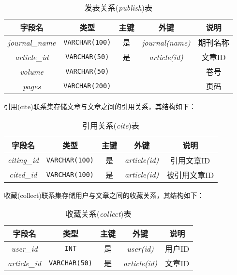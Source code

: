 \documentclass[UTF8,openany]{ctexbook}
\begin{document}
\begin{table}[H]
    \centering
    \begin{tabular}{|c|c|c|c|c|}
    \hline
    \textbf{字段名} & \textbf{类型} & \textbf{主键} & \textbf{外键} & \textbf{说明} \\
    \hline
    \textit{journal\_name} & \texttt{VARCHAR(100)} & 是 & \textit{journal(name)} & 期刊名称 \\
    \hline
    \textit{article\_id} & \texttt{VARCHAR(50)} & 是 & \textit{article(id)} & 文章ID \\
    \hline
    \textit{volume} & \texttt{VARCHAR(50)} & & & 卷号 \\
    \hline
    \textit{pages} & \texttt{VARCHAR(200)} & & & 页码 \\
    \hline
    \end{tabular}
    \caption{发表关系(\textit{publish})表}
\end{table}


引用(cite)联系集存储文章与文章之间的引用关系，其结构如下：

\begin{table}[H]
    \centering
    \begin{tabular}{|c|c|c|c|c|}
        \hline
        \textbf{字段名} & \textbf{类型} & \textbf{主键} & \textbf{外键} & \textbf{说明} \\
        \hline
        \textit{citing\_id} & \texttt{VARCHAR(100)} & 是 & \textit{article(id)} & 引用文章ID \\
        \hline
        \textit{cited\_id} & \texttt{VARCHAR(100)} & 是 & \textit{article(id)} & 被引用文章ID \\
        \hline
    \end{tabular}
    \caption{引用关系(\textit{cite})表}
\end{table}

收藏(collect)联系集存储用户与文章之间的收藏关系，其结构如下：

\begin{table}[H]
    \centering
    \begin{tabular}{|c|c|c|c|c|}
        \hline
        \textbf{字段名} & \textbf{类型} & \textbf{主键} & \textbf{外键} & \textbf{说明} \\
        \hline
        \textit{user\_id} & \texttt{INT} & 是 & \textit{user(id)} & 用户ID \\
        \hline
        \textit{article\_id} & \texttt{VARCHAR(50)} & 是 & \textit{article(id)} & 文章ID \\
        \hline
    \end{tabular}
    \caption{收藏关系(\textit{collect})表}
\end{table}
\end{document}
